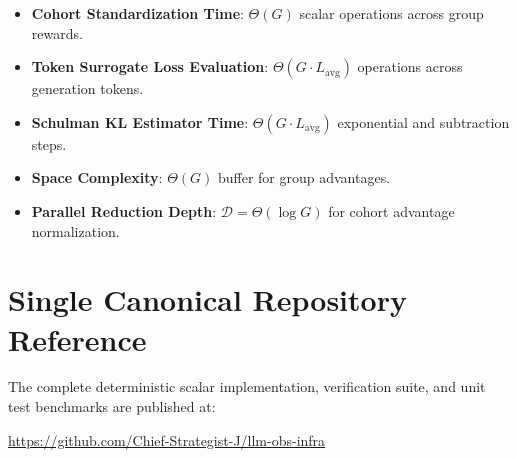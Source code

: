\documentclass[11pt,a4paper]{article}
\theoremstyle{definition}
\begin{document}
\begin{itemize}
    \item \textbf{Cohort Standardization Time}: $\Theta(G)$ scalar operations across group rewards.
    \item \textbf{Token Surrogate Loss Evaluation}: $\Theta(G \cdot L_{\text{avg}})$ operations across generation tokens.
    \item \textbf{Schulman KL Estimator Time}: $\Theta(G \cdot L_{\text{avg}})$ exponential and subtraction steps.
    \item \textbf{Space Complexity}: $\Theta(G)$ buffer for group advantages.
    \item \textbf{Parallel Reduction Depth}: $\mathcal{D} = \Theta(\log G)$ for cohort advantage normalization.
\end{itemize}

\section{Single Canonical Repository Reference}

The complete deterministic scalar implementation, verification suite, and unit test benchmarks are published at:
\begin{center}
\url{https://github.com/Chief-Strategist-J/llm-obs-infra}
\end{center}
\end{document}
